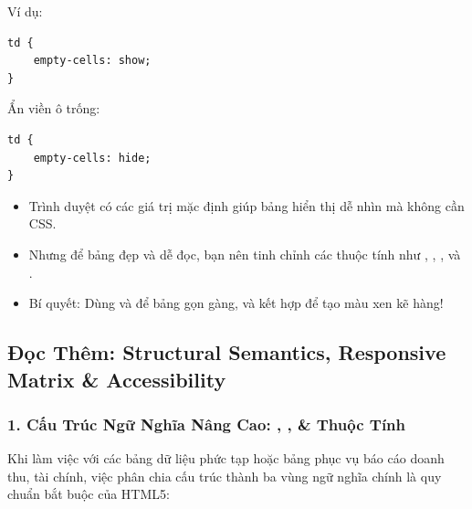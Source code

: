 Ví dụ:
\begin{codeWindow}
\begin{lstlisting}[language=HTML5]
td {
    empty-cells: show;
}
\end{lstlisting}
\end{codeWindow}

Ẩn viền ô trống:
\begin{codeWindow}
\begin{lstlisting}[language=HTML5]
td {
    empty-cells: hide;
}
\end{lstlisting}
\end{codeWindow}

\begin{conceptBox}
\begin{itemize}[leftmargin=1.5em, itemsep=2pt, parsep=0pt]
    \item Trình duyệt có các giá trị mặc định giúp bảng hiển thị dễ nhìn mà không cần CSS.
    \item Nhưng để bảng đẹp và dễ đọc, bạn nên tinh chỉnh các thuộc tính như , , , và .
    \item Bí quyết: Dùng  và  để bảng gọn gàng, và kết hợp  để tạo màu xen kẽ hàng!
\end{itemize}
\end{conceptBox}

\subsection{Đọc Thêm: Structural Semantics, Responsive Matrix \& Accessibility}

\subsubsection{1. Cấu Trúc Ngữ Nghĩa Nâng Cao: , ,  \& Thuộc Tính }

Khi làm việc với các bảng dữ liệu phức tạp hoặc bảng phục vụ báo cáo doanh thu, tài chính, việc phân chia cấu trúc thành ba vùng ngữ nghĩa chính là quy chuẩn bắt buộc của HTML5:

